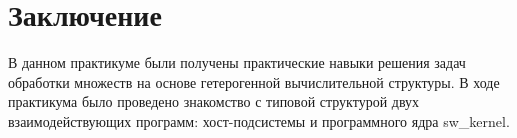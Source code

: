 \section*{Заключение}
В данном практикуме были получены практические навыки решения задач обработки множеств на основе гетерогенной вычислительной структуры. В ходе практикума было проведено знакомство с типовой структурой двух взаимодействующих программ: хост-подсистемы и программного ядра sw\_kernel.

\newpage